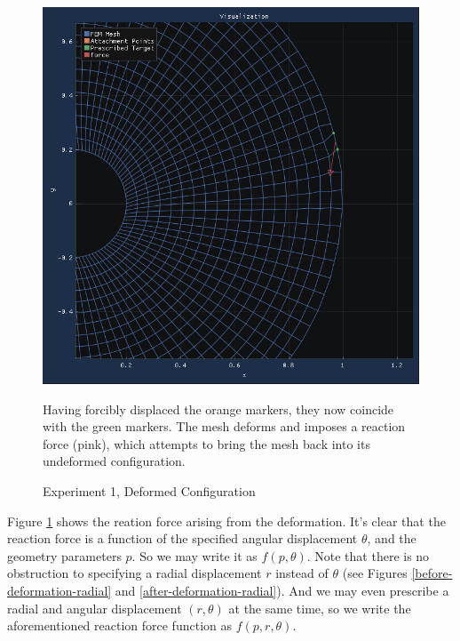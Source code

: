 \documentclass[11pt,letterpaper]{article}
\begin{document}
\begin{figure}[H]
\begin{center}
\includegraphics[width=14cm, keepaspectratio]{after_deformation}
\caption{Experiment 1, Deformed Configuration}
\label{after-deformation}
Having forcibly displaced the orange markers, they now coincide with the green markers. The mesh deforms and imposes a reaction force (pink), which attempts to bring the mesh back into its undeformed configuration.
\end{center}
\end{figure}

Figure \ref{after-deformation} shows the reation force arising from the deformation. It's clear that the reaction force is a function of the specified angular displacement $\theta$, and the geometry parameters $p$. So we may write it as $f(p, \theta)$. Note that there is no obstruction to specifying a radial displacement $r$ instead of $\theta$ (see Figures \ref{before-deformation-radial} and \ref{after-deformation-radial}). And we may even prescribe a radial and angular displacement $(r, \theta)$ at the same time, so we write the aforementioned reaction force function as $f(p, r, \theta)$. 
\end{document}
